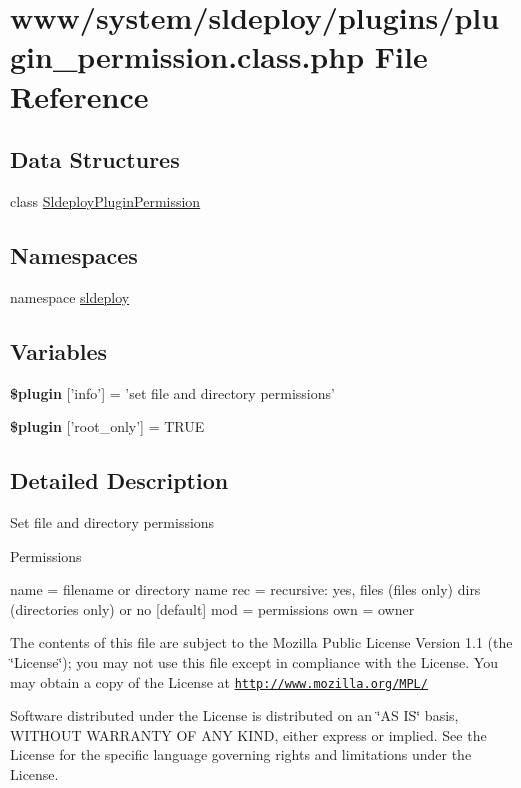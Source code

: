 \hypertarget{plugin__permission_8class_8php}{
\section{www/system/sldeploy/plugins/plugin\_\-permission.class.php File Reference}
\label{plugin__permission_8class_8php}
}
\subsection*{Data Structures}
\begin{DoxyCompactItemize}
\item 
class \hyperlink{class_sldeploy_plugin_permission}{SldeployPluginPermission}
\end{DoxyCompactItemize}
\subsection*{Namespaces}
\begin{DoxyCompactItemize}
\item 
namespace \hyperlink{namespacesldeploy}{sldeploy}
\end{DoxyCompactItemize}
\subsection*{Variables}
\begin{DoxyCompactItemize}
\item 
\hypertarget{plugin__permission_8class_8php_a95edf69ebbeaeedb03bab3bb010f2af9}{
{\bfseries \$plugin} \mbox{[}'info'\mbox{]} = 'set file and directory permissions'}
\label{plugin__permission_8class_8php_a95edf69ebbeaeedb03bab3bb010f2af9}

\item 
\hypertarget{plugin__permission_8class_8php_a1d302084fa15e3efe6c843cbb5096985}{
{\bfseries \$plugin} \mbox{[}'root\_\-only'\mbox{]} = TRUE}
\label{plugin__permission_8class_8php_a1d302084fa15e3efe6c843cbb5096985}

\end{DoxyCompactItemize}


\subsection{Detailed Description}
Set file and directory permissions

Permissions

name = filename or directory name rec = recursive: yes, files (files only) dirs (directories only) or no \mbox{[}default\mbox{]} mod = permissions own = owner

The contents of this file are subject to the Mozilla Public License Version 1.1 (the \char`\"{}License\char`\"{}); you may not use this file except in compliance with the License. You may obtain a copy of the License at \href{http://www.mozilla.org/MPL/}{\tt http://www.mozilla.org/MPL/}

Software distributed under the License is distributed on an \char`\"{}AS IS\char`\"{} basis, WITHOUT WARRANTY OF ANY KIND, either express or implied. See the License for the specific language governing rights and limitations under the License. 